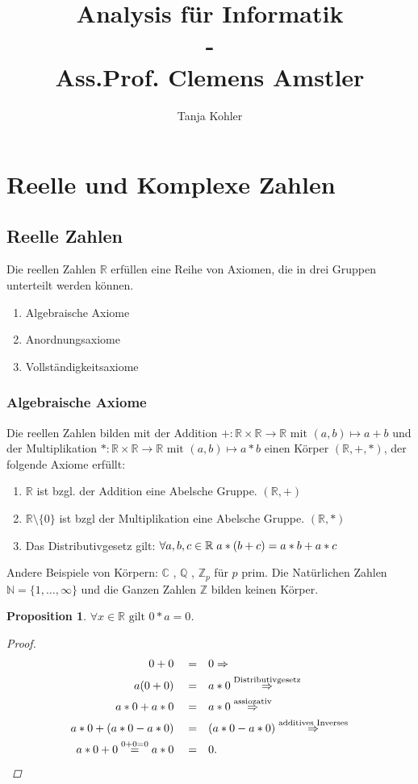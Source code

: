 \documentclass[a4paper,titlepage,oneside]{article}
\author{Tanja Kohler}
\title{Analysis für Informatik\small{ \\ - \\ Ass.Prof. Clemens Amstler}}
\def\C{\ensuremath{\mathbb{C}} }
\def\N{\ensuremath{\mathbb{N}} }
\def\Q{\ensuremath{\mathbb{Q}} }
\def\Z{\ensuremath{\mathbb{Z}} }
\def\R{\ensuremath{\mathbb{R}} }
\newcommand{\alQ}[1]{\ensuremath{\quad#1&\quad}}
\newcommand{\fa}[1]{\ensuremath{\forall#1}}
\newcommand{\fain}[2]{\ensuremath{\forall#1\in#2}}
\def\sp{\hspace{0,1cm}}
\theoremstyle{thmstyle}
\newtheorem{prop}[satz]{Proposition}
\begin{document}
\maketitle

\section{Reelle und Komplexe Zahlen}
\subsection{Reelle Zahlen}
Die reellen Zahlen \R erfüllen eine Reihe von Axiomen, die in drei Gruppen unterteilt werden können.

\begin{enumerate}[label=\Roman*.]
\item Algebraische Axiome
\item Anordnungsaxiome
\item Vollständigkeitsaxiome
\end{enumerate}

\subsubsection{Algebraische Axiome}
Die reellen Zahlen bilden mit der Addition \( + : \R \times \R \to \R \text{ mit } (a,b) \mapsto a + b\) und der Multiplikation \( * :  \R \times \R \to \R \text{ mit } (a,b) \mapsto a * b \)
einen Körper \((\R, +, * )\), der folgende Axiome erfüllt: 
\begin{enumerate}[label=\arabic*)]
\item $\R$ ist bzgl. der Addition eine Abelsche Gruppe. \((\R,+)\)
\item $\R \setminus \{0\}$ ist bzgl der Multiplikation eine Abelsche Gruppe. \((\R,*)\)
\item Das Distributivgesetz gilt: $ \fa a,b,c \in \R \sp a * (b + c) = a * b + a * c$
\end{enumerate}
Andere Beispiele von Körpern: \C, \Q, $\Z_p$ für $p$ prim.
Die Natürlichen Zahlen $ \N = \{1,\dots,\infty \} $ und die Ganzen Zahlen $\Z$ bilden keinen Körper.

\begin{prop}
$\fain{x}{\R} \text{ gilt } 0 * a = 0$.
\begin{proof}
\begin{align*}
0+0 \alQ{=} 0 \Rightarrow \\
a ( 0 + 0 )\alQ{=} a * 0 \overset{\text{Distributivgesetz}}{\Rightarrow} \\
a * 0 + a * 0 \alQ{=} a * 0  \overset{\text{assiozativ}}{\Rightarrow} \\
a * 0 + (a * 0 - a * 0) \alQ{=} (a * 0 - a * 0) \overset{\text{additives Inverses}}{\Rightarrow} \\
a * 0 +  0 \overset{0+0=0}{=} a * 0 \alQ{=} 0.
\end{align*}
\end{proof}
\end{prop}
\end{document}
